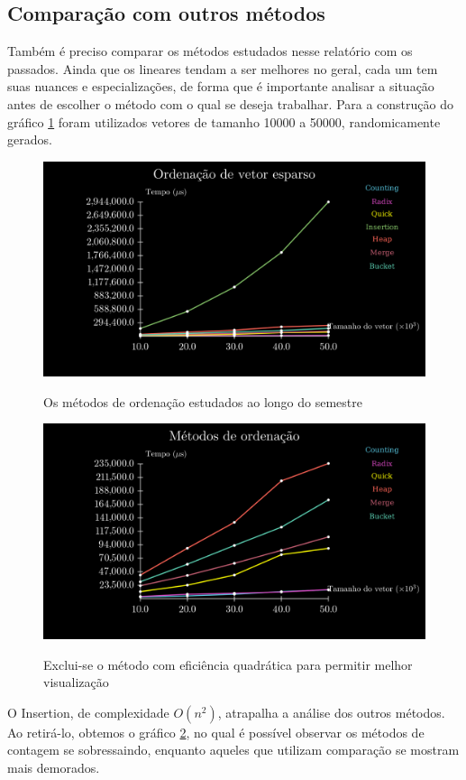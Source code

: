 \documentclass[fontsize=11pt]{article}
\begin{document}
    \subsection{Comparação com outros métodos}
      Também é preciso comparar os métodos estudados nesse relatório com os passados. Ainda que 
      os lineares tendam a ser melhores no geral, cada um tem suas nuances e especializações, de forma
      que é importante analisar a situação antes de escolher o método com o qual se deseja trabalhar.
      Para a construção do gráfico \ref{fig:met1} foram utilizados vetores de tamanho 10000 a 50000, randomicamente 
      gerados.
      \begin{figure}[H]
        \caption{Os métodos de ordenação estudados ao longo do semestre}
        \includegraphics[width=\textwidth]{allmethods1.png}
        \label{fig:met1}
      \end{figure}
      \begin{figure}[H]
        \caption{Exclui-se o método com eficiência quadrática para permitir melhor visualização}
        \includegraphics[width=\textwidth]{allmethods2.png}
        \label{fig:met2}
      \end{figure}
      O Insertion, de complexidade $O(n^2)$, atrapalha a análise dos outros métodos.
      Ao retirá-lo, obtemos o gráfico \ref{fig:met2}, no qual é possível observar os 
      métodos de contagem se sobressaindo, enquanto 
      aqueles que utilizam comparação se mostram mais demorados.
\end{document}
